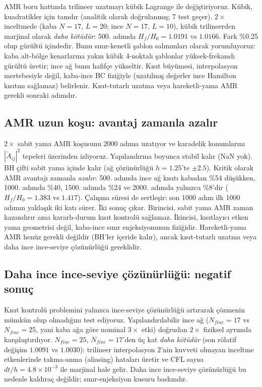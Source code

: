 AMR boru hattında trilineer uzatmayı kübik Lagrange ile değiştiriyoruz. Kübik, kuadratikler için tamdır (analitik olarak doğrulanmış; 7 test geçer). $2\times$ inceltmede (kaba $N=17$, $L=20$; ince $N=17$, $L=10$), kübik trilineerden marjinal olarak \emph{daha kötüdür}: 500. adımda $H_f/H_0 = 1.0191$ vs $1.0166$. Fark \%0.25 olup gürültü içindedir. Bunu sınır-kenetli şablon salınımları olarak yorumluyoruz: kaba alt-bölge kenarlarına yakın kübik 4-noktalı şablonlar yüksek-frekanslı gürültü üretir; ince ağ bunu hafifçe yükseltir. Kısıt büyümesi, interpolasyon mertebesiyle değil, kaba-ince BC fiziğiyle (uzatılmış değerler ince Hamilton kısıtını sağlamaz) belirlenir. Kısıt-tutarlı uzatma veya hareketli-yama AMR gerekli sonraki adımdır.

\subsection{AMR uzun koşu: avantaj zamanla azalır}

$2\times$ sabit yama AMR koşusunu 2000 adıma uzatıyor ve karadelik konumlarını $|\tilde A_{ij}|^2$ tepeleri üzerinden izliyoruz. Yapılandırma boyunca stabil kalır (NaN yok). BH çifti sabit yama içinde kalır (ağ çözünürlüğü $h=1.25$'te $\pm 2.5$). Kritik olarak AMR avantajı zamanla \emph{azalır}: 500. adımda ince ağ kısıtı kabadan \%54 düşükken, 1000. adımda \%40, 1500. adımda \%24 ve 2000. adımda yalnızca \%8'dir ($H_f/H_0 = 1.383$ vs $1.417$). Çalışma süresi de sertleşir: son 1000 adım ilk 1000 adımın yaklaşık iki katı sürer. İki sonuç çıkar. Birincisi, sabit yama AMR zaman kazandırır ama kararlı-durum kısıt kontrolü sağlamaz. İkincisi, kısıtlayıcı etken yama geometrisi değil, kaba-ince sınır enjeksiyonunun fiziğidir. Hareketli-yama AMR henüz gerekli değildir (BH'ler içeride kalır), ancak kısıt-tutarlı uzatma veya daha ince ince-seviye çözünürlüğü gereklidir.

\subsection{Daha ince ince-seviye çözünürlüğü: negatif sonuç}

Kısıt kontrolü problemini yalnızca ince-seviye çözünürlüğü artırarak çözmenin mümkün olup olmadığını test ediyoruz. Yapılandırılabilir ince ağ ($N_{fine}=17$ vs $N_{fine}=25$, yani kaba ağa göre nominal $3\times$ etki) doğrudan $2\times$ fiziksel ayrımda karşılaştırılıyor. $N_{fine}=25$, $N_{fine}=17$'den üç kat \emph{daha kötüdür} (son rölatif değişim $1.0091$ vs $1.0030$): trilineer interpolasyon $2$'nin kuvveti olmayan inceltme etkenlerinde takma-anma (aliasing) hataları üretir ve CFL sayısı $dt/h = 4.8\times10^{-3}$ ile marjinal hale gelir. Daha ince ince-seviye çözünürlüğü bu nedenle kaldıraç değildir; sınır-enjeksiyon kusuru baskındır.

